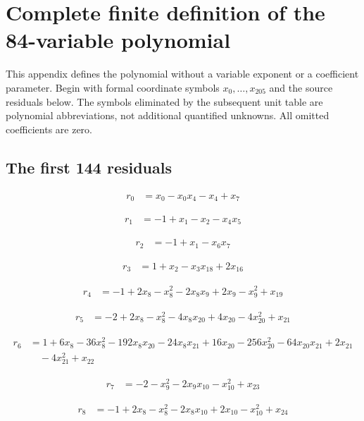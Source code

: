 \section{Complete finite definition of the 84-variable polynomial}
\label{app:complete84}
This appendix defines the polynomial without a variable exponent or a
coefficient parameter. Begin with formal coordinate symbols
$x_0,\ldots,x_{205}$ and the source residuals below. The symbols eliminated
by the subsequent unit table are polynomial abbreviations, not additional
quantified unknowns. All omitted coefficients are zero.
\subsection{The first 144 residuals}


\begin{align*}
r_{0}&=x_{0}-x_{0}x_{4}-x_{4}+x_{7}
\end{align*}

\begin{align*}
r_{1}&=-1+x_{1}-x_{2}-x_{4}x_{5}
\end{align*}

\begin{align*}
r_{2}&=-1+x_{1}-x_{6}x_{7}
\end{align*}

\begin{align*}
r_{3}&=1+x_{2}-x_{3}x_{18}+2x_{16}
\end{align*}

\begin{align*}
r_{4}&=-1+2x_{8}-x_{8}^{2}-2x_{8}x_{9}+2x_{9}-x_{9}^{2}+x_{19}
\end{align*}

\begin{align*}
r_{5}&=-2+2x_{8}-x_{8}^{2}-4x_{8}x_{20}+4x_{20}-4x_{20}^{2}+x_{21}
\end{align*}

\begin{align*}
r_{6}&=1+6x_{8}-36x_{8}^{2}-192x_{8}x_{20}-24x_{8}x_{21}+16x_{20}-256x_{20}^{2}-64x_{20}x_{21}+2x_{21}\\
&\quad -4x_{21}^{2}+x_{22}
\end{align*}

\begin{align*}
r_{7}&=-2-x_{9}^{2}-2x_{9}x_{10}-x_{10}^{2}+x_{23}
\end{align*}

\begin{align*}
r_{8}&=-1+2x_{8}-x_{8}^{2}-2x_{8}x_{10}+2x_{10}-x_{10}^{2}+x_{24}
\end{align*}

